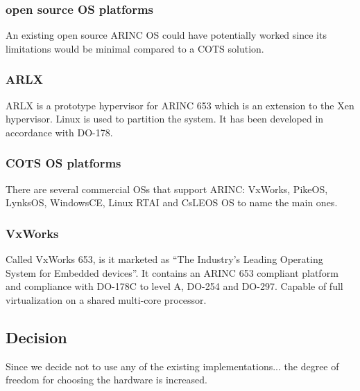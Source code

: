 \subsubsection{open source OS platforms}
An existing open source ARINC OS could have potentially worked since its limitations would be minimal
compared to a COTS solution. %

\subsubsection{ARLX}
ARLX is a prototype hypervisor for ARINC 653 which is an extension to the Xen hypervisor.
Linux is used to partition the system.
It has been developed in accordance with DO-178.

\subsubsection{COTS OS platforms}
There are several commercial OSs that support ARINC:
VxWorks, PikeOS, LynksOS, WindowsCE, Linux RTAI and CsLEOS OS to name the main ones.

\subsubsection{VxWorks}
Called VxWorks 653, is it marketed as ``The Industry's Leading Operating System for Embedded devices''.
It contains an ARINC 653 compliant platform and compliance with DO-178C to level A, DO-254 and DO-297.
Capable of full virtualization on a shared multi-core processor.

\subsection{Decision}
Since we decide not to use any of the existing implementations...
the degree of freedom for choosing the hardware is increased.
\fi

